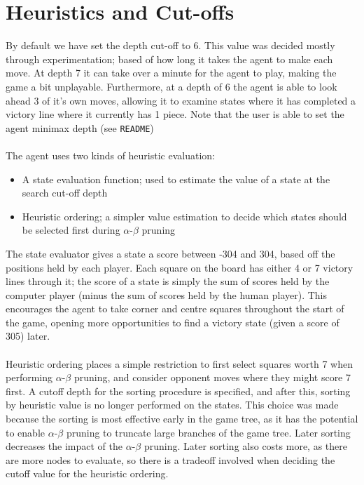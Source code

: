 \documentclass[10pt,twocolumn]{article}
\begin{document}
\section{Heuristics and Cut-offs}
By default we have set the depth cut-off to 6. This value was decided mostly 
through experimentation; based of how long it takes the agent to make each move.
At depth 7 it can take over a minute for the agent to play, making the game a bit unplayable.
Furthermore, at a depth of 6 the agent is able to look ahead 3 of it's own moves,
allowing it to examine states where it has completed a victory line where it currently
has 1 piece. Note that the user is able to set the agent minimax depth (see \texttt{README})\\\\
The agent uses two kinds of heuristic evaluation:
\begin{itemize}
\item[] A state evaluation function; used to estimate the value of a state at the
search cut-off depth
\item[] Heuristic ordering; a simpler value estimation to decide which states
should be selected first during $\alpha$-$\beta$ pruning
\end{itemize}
The state evaluator gives a state a score between -304 and 304, based off the positions held by
each player. Each square on the board has either 4 or 7 victory lines through it; the
score of a state is simply the sum of scores held by the computer player (minus the sum
of scores held by the human player). This encourages the agent to take corner and centre
squares throughout the start of the game, opening more opportunities to find a victory state 
(given a score of 305) later.\\\\
Heuristic ordering places a simple restriction to first select squares worth 7
when performing $\alpha$-$\beta$ pruning, and consider opponent moves where they
might score 7 first. A cutoff depth for the sorting procedure is specified,
and after this, sorting by heuristic value is no longer performed on the states. This choice was made
because the sorting is most effective early in the game tree, as it has the potential to enable $\alpha$-$\beta$ pruning
to truncate large branches of the game tree. Later sorting decreases the impact of the $\alpha$-$\beta$ pruning. Later sorting
also costs more, as there are more nodes to evaluate, so there is a tradeoff involved when deciding the cutoff value for the
heuristic ordering.
\end{document}
